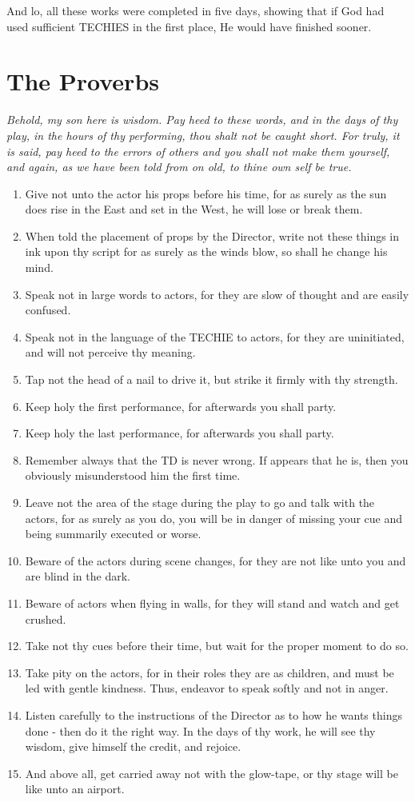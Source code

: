 \documentclass[10pt,a4paper,oneside]{article}
\begin{document}
And lo, all these works were completed in five days, showing that if God had used sufficient TECHIES in the first place, He would have finished sooner.

\section{The Proverbs}
\textit{Behold, my son here is wisdom. Pay heed to these words, and in the days of thy play, in the hours of thy performing, thou shalt not be caught short. For truly, it is said, pay heed to the errors of others and you shall not make them yourself, and again, as we have been told from on old, to thine own self be true.}

\begin{enumerate}
\item Give not unto the actor his props before his time, for as surely as the sun does rise in the East and set in the West, he will lose or break them. 
\item When told the placement of props by the Director, write not these things in ink upon thy script for as surely as the winds blow, so shall he change his mind. 
\item Speak not in large words to actors, for they are slow of thought and are easily confused. 
\item Speak not in the language of the TECHIE to actors, for they are uninitiated, and will not perceive thy meaning. 
\item Tap not the head of a nail to drive it, but strike it firmly with thy strength. 
\item Keep holy the first performance, for afterwards you shall party. 
\item Keep holy the last performance, for afterwards you shall party. 
\item Remember always that the TD is never wrong. If appears that he is, then you obviously misunderstood him the first time. 
\item Leave not the area of the stage during the play to go and talk with the actors, for as surely as you do, you will be in danger of missing your cue and being summarily executed or worse. 
\item Beware of the actors during scene changes, for they are not like unto you and are blind in the dark. 
\item Beware of actors when flying in walls, for they will stand and watch and get crushed. 
\item Take not thy cues before their time, but wait for the proper moment to do so. 
\item Take pity on the actors, for in their roles they are as children, and must be led with gentle kindness. Thus, endeavor to speak softly and not in anger. 
\item Listen carefully to the instructions of the Director as to how he wants things done - then do it the right way. In the days of thy work, he will see thy wisdom, give himself the credit, and rejoice. 
\item And above all, get carried away not with the glow-tape, or thy stage will be like unto an airport.\
\end{enumerate}
\end{document}

